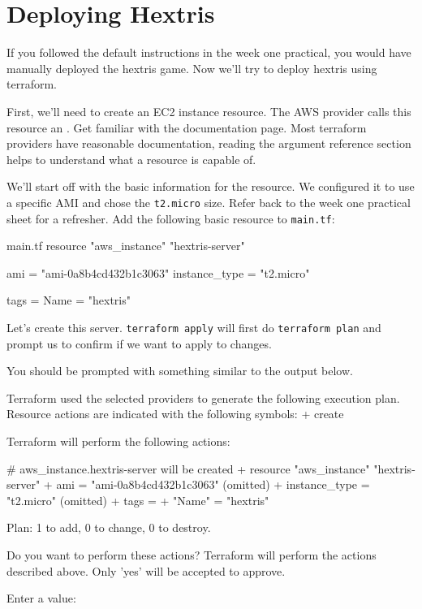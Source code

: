 \documentclass{csse4400}
\begin{document}
\section{Deploying Hextris}
If you followed the default instructions in the week one practical, you would have manually deployed the hextris game.
Now we'll try to deploy hextris using terraform.

First, we'll need to create an EC2 instance resource.
The AWS provider calls this resource an .
Get familiar with the documentation page.
Most terraform providers have reasonable documentation, reading the argument reference section helps to understand what a resource is capable of.

We'll start off with the basic information for the resource.
We configured it to use a specific AMI and chose the \texttt{t2.micro} size.
Refer back to the week one practical sheet for a refresher.
Add the following basic resource to \texttt{main.tf}:

\begin{code}[language=terraform]{main.tf}
resource "aws_instance" "hextris-server" {
    ami           = "ami-0a8b4cd432b1c3063"
    instance_type = "t2.micro"
    
    tags = {
        Name = "hextris"
    }
}      
\end{code}

Let's create this server.
\texttt{terraform apply} will first do \texttt{terraform plan} and prompt us to confirm if we want to apply to changes.


You should be prompted with something similar to the output below.

\begin{code}[language=terraform-plan]{}
Terraform used the selected providers to generate the following execution plan. Resource actions are indicated with the following symbols:
  + create

Terraform will perform the following actions:

  # aws_instance.hextris-server will be created
  + resource "aws_instance" "hextris-server" {
      + ami                                  = "ami-0a8b4cd432b1c3063"
      (omitted)
      + instance_type                        = "t2.micro"
      (omitted)
      + tags                                 = {
          + "Name" = "hextris"
        }
    }

Plan: 1 to add, 0 to change, 0 to destroy.

Do you want to perform these actions?
  Terraform will perform the actions described above.
  Only 'yes' will be accepted to approve.

  Enter a value: 
\end{code}
\end{document}
